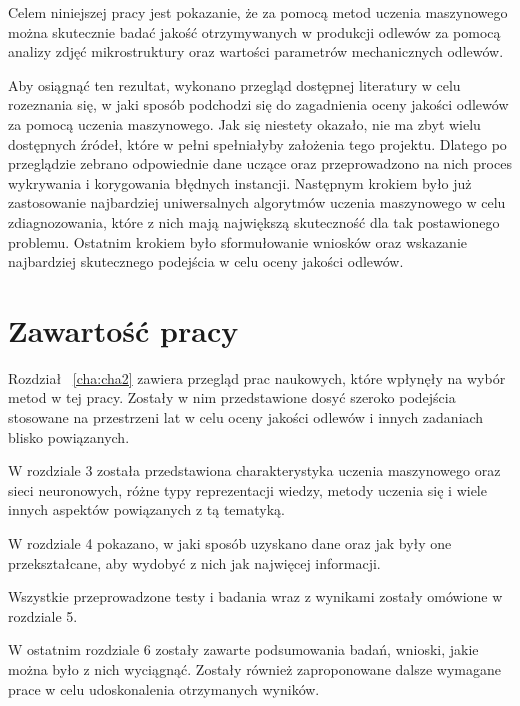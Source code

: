 Celem niniejszej pracy jest pokazanie, że za pomocą metod uczenia maszynowego można skutecznie badać jakość otrzymywanych w produkcji odlewów za pomocą analizy zdjęć mikrostruktury oraz wartości parametrów mechanicznych odlewów. 

Aby osiągnąć ten rezultat, wykonano przegląd dostępnej literatury w celu rozeznania się, w jaki sposób podchodzi się do zagadnienia oceny jakości odlewów za pomocą uczenia maszynowego. Jak się niestety okazało, nie ma zbyt wielu dostępnych źródeł, które w pełni spełniałyby założenia tego projektu. Dlatego po przeglądzie zebrano odpowiednie dane uczące oraz przeprowadzono na nich proces wykrywania i korygowania błędnych instancji. Następnym krokiem było już zastosowanie najbardziej uniwersalnych algorytmów uczenia maszynowego w celu zdiagnozowania, które z nich mają największą skuteczność dla tak postawionego problemu. Ostatnim krokiem było sformułowanie wniosków oraz wskazanie najbardziej skutecznego podejścia w celu oceny jakości odlewów.



\section{Zawartość pracy}

Rozdział ~\ref{cha:cha2} zawiera przegląd prac naukowych, które wpłynęły na wybór metod w tej pracy. Zostały w nim przedstawione dosyć szeroko podejścia stosowane na przestrzeni lat w celu oceny jakości odlewów i innych zadaniach blisko powiązanych. 

W rozdziale 3 została przedstawiona charakterystyka uczenia maszynowego oraz sieci neuronowych, różne typy reprezentacji wiedzy, metody uczenia się i wiele innych aspektów powiązanych z tą tematyką. 

W rozdziale 4 pokazano, w jaki sposób uzyskano dane oraz jak były one przekształcane, aby wydobyć z nich jak najwięcej informacji. 

Wszystkie przeprowadzone testy i badania wraz z wynikami zostały omówione w rozdziale 5. 

W ostatnim rozdziale 6 zostały zawarte podsumowania badań, wnioski, jakie można było z nich wyciągnąć. Zostały również zaproponowane dalsze wymagane prace w celu udoskonalenia otrzymanych wyników.













